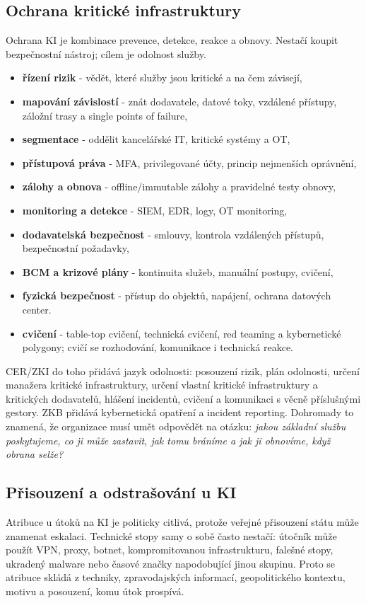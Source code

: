 \subsection*{Ochrana kritické infrastruktury}
Ochrana KI je kombinace prevence, detekce, reakce a obnovy. Nestačí koupit bezpečnostní nástroj; cílem je odolnost služby.
\begin{itemize}
  \item \textbf{řízení rizik} - vědět, které služby jsou kritické a na čem závisejí,
  \item \textbf{mapování závislostí} - znát dodavatele, datové toky, vzdálené přístupy, záložní trasy a single points of failure,
  \item \textbf{segmentace} - oddělit kancelářské IT, kritické systémy a OT,
  \item \textbf{přístupová práva} - MFA, privilegované účty, princip nejmenších oprávnění,
  \item \textbf{zálohy a obnova} - offline/immutable zálohy a pravidelné testy obnovy,
  \item \textbf{monitoring a detekce} - SIEM, EDR, logy, OT monitoring,
  \item \textbf{dodavatelská bezpečnost} - smlouvy, kontrola vzdálených přístupů, bezpečnostní požadavky,
  \item \textbf{BCM a krizové plány} - kontinuita služeb, manuální postupy, cvičení,
  \item \textbf{fyzická bezpečnost} - přístup do objektů, napájení, ochrana datových center.
  \item \textbf{cvičení} - table-top cvičení, technická cvičení, red teaming a kybernetické polygony; cvičí se rozhodování, komunikace i technická reakce.
\end{itemize}

CER/ZKI do toho přidává jazyk odolnosti: posouzení rizik, plán odolnosti, určení manažera kritické infrastruktury, určení vlastní kritické infrastruktury a kritických dodavatelů, hlášení incidentů, cvičení a komunikaci s věcně příslušnými gestory. ZKB přidává kybernetická opatření a incident reporting. Dohromady to znamená, že organizace musí umět odpovědět na otázku: \emph{jakou základní službu poskytujeme, co ji může zastavit, jak tomu bráníme a jak ji obnovíme, když obrana selže?}

\subsection*{Přisouzení a odstrašování u KI}
Atribuce u útoků na KI je politicky citlivá, protože veřejné přisouzení státu může znamenat eskalaci. Technické stopy samy o sobě často nestačí: útočník může použít VPN, proxy, botnet, kompromitovanou infrastrukturu, falešné stopy, ukradený malware nebo časové značky napodobující jinou skupinu. Proto se atribuce skládá z techniky, zpravodajských informací, geopolitického kontextu, motivu a posouzení, komu útok prospívá.

